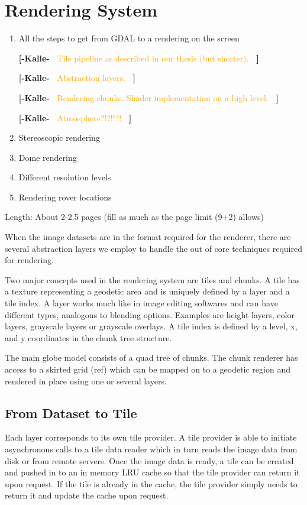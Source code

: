 \documentclass[journal]{vgtc}                %
\newcommand{\kallecomment}[1]{\textbf{[-Kalle-~}
    \textcolor{orange}{#1}
    \textbf{~]}}
\begin{document}
\section{Rendering System} \label{sec:renderingsystem}


\begin{enumerate}
  \item All the steps to get from GDAL to a rendering on the screen
  
  \kallecomment{Tile pipeline as described in our thesis (but shorter).}
  
  \kallecomment{Abstraction layers.}
  
  \kallecomment{Rendering chunks. Shader implementation on a high level.}
  
  \kallecomment{Atmosphere?!?!!?!}
  
  \item Stereoscopic rendering
  \item Dome rendering
  \item Different resolution levels
  \item Rendering rover locations
\end{enumerate}
Length: About 2-2.5 pages (fill as much as the page limit (9+2) allows)


When the image datasets are in the format required for the renderer, there are several abstraction layers we employ to handle the out of core techniques required for rendering.

Two major concepts used in the rendering system are tiles and chunks. A tile has a texture representing a geodetic area and is uniquely defined by a layer and a tile index.
A layer works much like in image editing softwares and can have different types, analogous to blending options.
Examples are height layers, color layers, grayscale layers or grayscale overlays.
A tile index is defined by a level, x, and y coordinates in the chunk tree structure.

The main globe model consists of a quad tree of chunks.
The chunk renderer has access to a skirted grid (ref) which can be mapped on to a geodetic region and rendered in place using one or several layers.

\subsection{From Dataset to Tile}

Each layer corresponds to its own tile provider.
A tile provider is able to initiate asynchronous calls to a tile data reader which in turn reads the image data from disk or from remote servers.
Once the image data is ready, a tile can be created and pushed in to an in memory LRU cache so that the tile provider can return it upon request.
If the tile is already in the cache, the tile provider simply needs to return it and update the cache upon request.
\end{document}
